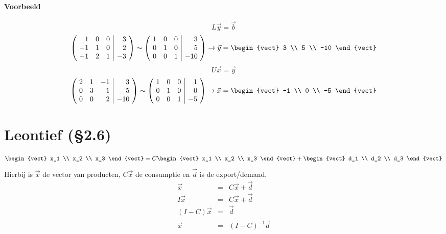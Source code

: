 \paragraph{Voorbeeld}
\[ L \vec{y} = \vec{b} \]
\[ \left(\!\begin{array}{rrr|r}
	1 & 0 & 0 & 3 \\
	-1 & 1 & 0 & 2 \\
	-1 & 2 & 1 & -3
\end{array}\!\right) \sim
\left(\!\begin{array}{rrr|r}
	1 & 0 & 0 & 3 \\
	0 & 1 & 0 & 5 \\
	0 & 0 & 1 & -10
\end{array}\!\right) \to \vec{y} = \begin{vect} 3 \\ 5 \\ -10 \end{vect} \]
\[ U \vec{x} = \vec{y} \]
\[ \left(\!\begin{array}{rrr|r}
	2 & 1 & -1 & 3 \\
	0 & 3 & -1 & 5 \\
	0 & 0 & 2 & -10
\end{array}\!\right) \sim
\left(\!\begin{array}{rrr|r}
	1 & 0 & 0 & 1 \\
	0 & 1 & 0 & 0 \\
	0 & 0 & 1 & -5
\end{array}\!\right) \to \vec{x} = \begin{vect} -1 \\ 0 \\ -5 \end{vect} \]

\section{Leontief (\S2.6)}
\[ \begin{vect} x_1 \\ x_2 \\ x_3 \end{vect} =
C \begin{vect} x_1 \\ x_2 \\ x_3 \end{vect} +
\begin{vect} d_1 \\ d_2 \\ d_3 \end{vect} \]
Hierbij is $\vec{x}$ de vector van producten, $C \vec{x}$ de consumptie en $\vec{d}$ is de export/demand.
\begin{eqnarray*}
	\vec{x} &=& C \vec{x} + \vec{d} \\
	I \vec{x} &=& C \vec{x} + \vec{d} \\
	(I-C) \vec{x} &=& \vec{d} \\
	\vec{x} &=& (I-C)^{-1} \vec{d}
\end{eqnarray*}

